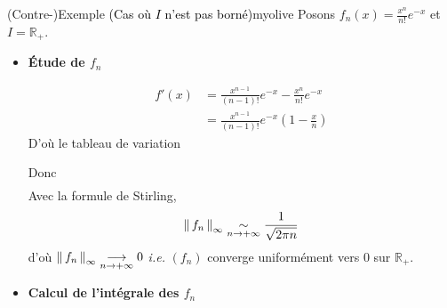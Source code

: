     \begin{omed}{(Contre-)Exemple \textcolor{black}{(Cas où $I$ n’est pas borné)}}{myolive}
        Posons $f_n(x) = \frac{x^n}{n!} e^{-x}$ et $I = \mathbb{R}_+$.
        \begin{itemize}
            \item \textbf{Étude de $f_n$}
            
            \begin{align*}
                f'(x) 
                &= \frac{x^{n-1}}{(n-1)!} e^{-x} - \frac{x^n}{n!} e^{-x} \\
                &= \frac{x^{n-1}}{(n-1)!} e^{-x} \left( 1 - \frac{x}{n} \right)
            \end{align*}
            D’où le tableau de variation 
            \begin{center}
            \end{center}
            Donc 
            \begin{align*}
                \
            \end{align*}
            Avec la formule de Stirling,
            \[ \left\lVert\,f_n\,\right\rVert_{\infty} \underset{n \rightarrow +\infty}{\sim} \frac{1}{\sqrt{2 \pi n}} \]
            d’où $\left\lVert\,f_n\,\right\rVert_{\infty} \underset{n \rightarrow +\infty}{\longrightarrow} 0$ \textit{i.e.} $(f_n)$ converge uniformément vers $0$ sur $\mathbb{R}_+$.

            \item \textbf{Calcul de l’intégrale des $f_n$}
            

\end{itemize}
\end{omed}
